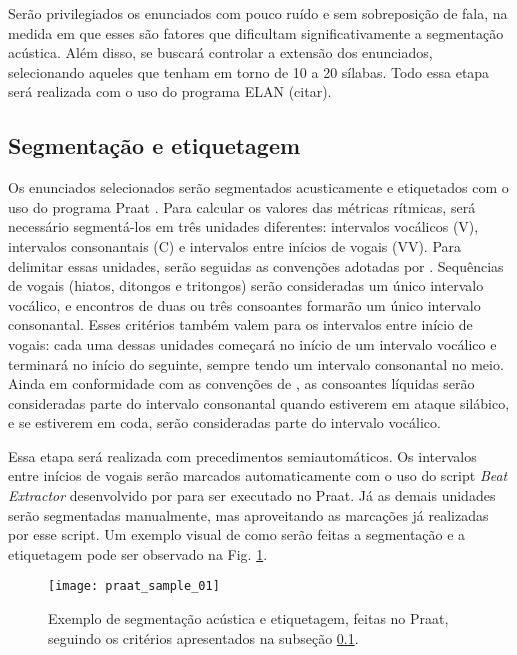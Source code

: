 \documentclass[
		a4paper,	%
		12pt,		%
		]{article}	%
\begin{document}
	Serão privilegiados os enunciados com pouco ruído e sem sobreposição de
	fala, na medida em que esses são fatores que dificultam significativamente a
	segmentação acústica. Além disso, se buscará controlar a extensão dos
	enunciados, selecionando aqueles que tenham em torno de 10 a 20 sílabas.
	Todo essa etapa será realizada com o uso do programa ELAN (citar).
	
	\subsection{Segmentação e etiquetagem} \label{segm}

	Os enunciados selecionados serão segmentados acusticamente e etiquetados com
	o uso do programa Praat \citep{Boersma.Weenink2019}. Para calcular os
	valores das métricas rítmicas, será necessário segmentá-los em três unidades
	diferentes: intervalos vocálicos (V), intervalos consonantais (C) e
	intervalos entre inícios de vogais (VV). Para delimitar essas unidades,
	serão seguidas as convenções adotadas por \citet{Ramus.etal1999}.
	Sequências de vogais (hiatos, ditongos e tritongos) serão consideradas um
	único intervalo vocálico, e encontros de duas ou três consoantes formarão um
	único intervalo consonantal. Esses critérios também valem para os intervalos
	entre início de vogais: cada uma dessas unidades começará no início de um
	intervalo vocálico e terminará no início do seguinte, sempre tendo um
	intervalo consonantal no meio. Ainda em conformidade com as convenções de
	\citet{Ramus.etal1999}, as consoantes líquidas serão consideradas parte do
	intervalo consonantal quando estiverem em ataque silábico, e se estiverem em
	coda, serão consideradas parte do intervalo vocálico.

	Essa etapa será realizada com precedimentos semiautomáticos. Os intervalos
	entre inícios de vogais serão marcados automaticamente com o uso do script
	\emph{Beat Extractor} desenvolvido por \citet{Barbosa2003} para ser
	executado no Praat. Já as demais unidades serão segmentadas manualmente, mas
	aproveitando as marcações já realizadas por esse script. Um exemplo visual
	de como serão feitas a segmentação e a etiquetagem pode ser observado na
	Fig. \ref{praat}.

	\begin{figure}[h]
		\vspace{1em}
		\caption{Exemplo de segmentação acústica e etiquetagem, feitas no Praat,
			seguindo os critérios apresentados na subseção \ref{segm}.}
		\label{praat}
		\centering
		\texttt{[image: praat\_sample\_01]}
	\end{figure}
		
\end{document}
